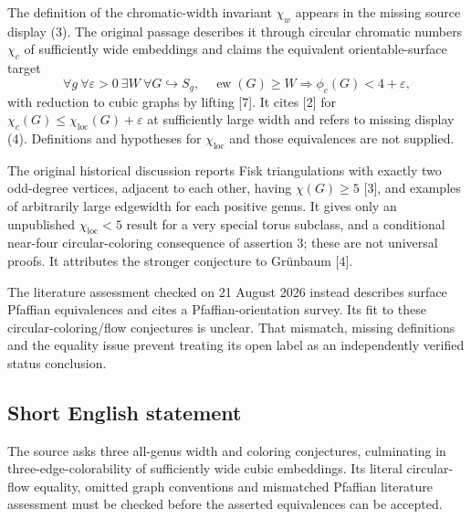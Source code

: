 \documentclass[11pt]{article}
\begin{document}
The definition of the chromatic-width invariant $\chi_w$ appears in the missing source display (3). The original passage describes it through circular chromatic numbers $\chi_c$ of sufficiently wide embeddings and claims the equivalent orientable-surface target
\[
 \forall g\ \forall\varepsilon>0\ \exists W\ \forall G\hookrightarrow S_g,
 \quad\operatorname{ew}(G)\ge W\Longrightarrow\phi_c(G)<4+\varepsilon,
\]
with reduction to cubic graphs by lifting [7]. It cites [2] for $\chi_c(G)\le\chi_{\mathrm{loc}}(G)+\varepsilon$ at sufficiently large width and refers to missing display (4). Definitions and hypotheses for $\chi_{\mathrm{loc}}$ and those equivalences are not supplied.

The original historical discussion reports Fisk triangulations with exactly two odd-degree vertices, adjacent to each other, having $\chi(G)\ge5$ [3], and examples of arbitrarily large edgewidth for each positive genus. It gives only an unpublished $\chi_{\mathrm{loc}}<5$ result for a very special torus subclass, and a conditional near-four circular-coloring consequence of assertion 3; these are not universal proofs. It attributes the stronger conjecture to Gr\"unbaum [4].

The literature assessment checked on 21 August 2026 instead describes surface Pfaffian equivalences and cites a Pfaffian-orientation survey. Its fit to these circular-coloring/flow conjectures is unclear. That mismatch, missing definitions and the equality issue prevent treating its open label as an independently verified status conclusion.
\subsection{Short English statement}
The source asks three all-genus width and coloring conjectures, culminating in three-edge-colorability of sufficiently wide cubic embeddings. Its literal circular-flow equality, omitted graph conventions and mismatched Pfaffian literature assessment must be checked before the asserted equivalences can be accepted.
\end{document}
